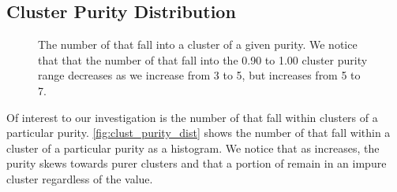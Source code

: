 \subsection{Cluster Purity Distribution}
\begin{figure}
    \centering
    \hfill
    \hfill
    
    \caption{The number of \isols{} that fall into a cluster of a given purity. We notice that that the number of \isols{} that fall into the 0.90 to 1.00 cluster purity range decreases as we increase \minneigh{} from 3 to 5, but increases from 5 to 7.}
    \label{fig:clust_purity_dist}
\end{figure}

Of interest to our investigation is the number of \isols{} that fall within clusters of a particular purity. 
\autoref{fig:clust_purity_dist} shows the number of \isols{} that fall within a cluster of a particular purity as a histogram.
We notice that as \minneigh{} increases, the purity skews towards purer clusters and that a portion of \isols{} remain in an impure cluster regardless of the \minneigh{} value.

